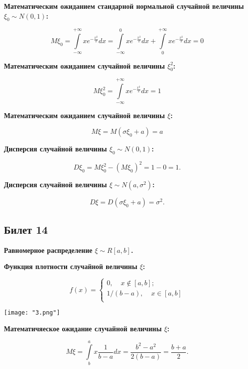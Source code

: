 \textbf{Математическим ожиданием стандарной нормальной
случайной величины $\xi_0 \sim N(0, 1)$:}
\smallskip     

\[
    M\xi_0 = \int\limits^{+\infty}_{-\infty} x e^{-\frac{x^2}{2}} dx =
    \int\limits^0_{-\infty} x e^{-\frac{x^2}{2}} dx +
    \int\limits^{+\infty}_{0} x e^{-\frac{x^2}{2}} dx = 0
\]
\bigskip

\textbf{Математическим ожиданием случайной величины $\xi_0^2$:}
\smallskip     

\[
    M\xi_0^2 = \int\limits^{+\infty}_{-\infty} x e^{-\frac{x^2}{2}} dx = 1
\]
\bigskip

\textbf{Математическим ожиданием случайной величины $\xi$:}
\smallskip     

\[
    M\xi = M(\sigma \xi_0 + a) = a
\]
\bigskip    

\textbf{Дисперсия случайной величины $\xi_0 \sim N(0, 1)$:}  
\smallskip

\[
    D\xi_0 = M\xi^2_0 - (M\xi_0)^2 = 1 - 0 = 1.  
\]

\textbf{Дисперсия случайной величины $\xi \sim N(a,
\sigma^2)$:}  
\smallskip

\[
    D\xi = D(\sigma\xi_0 + a) = \sigma^2.  
\]  
\bigskip

\subsection{Билет 14}

\textbf{Равномерное распределение $\xi \sim R[a, b]$.}
\bigskip

\textbf{Функция плотности случайной величины $\xi$:}
\smallskip

\begin{equation*}
    f(x)=
    \begin{cases}
        0, \;\;\;\; x \notin [a, b];\\
        1/(b - a), \;\;\;\; x \in [a, b]\\
    \end{cases}
\end{equation*}

\begin{center}
    \texttt{[image: "3.png"]}
\end{center}
\bigskip

\textbf{Математичяеское ожидание случайной величины $\xi$:}
\smallskip

\[
    M\xi = \int\limits^a_b x \frac{1}{b - a}dx = \frac{b^2 - a^2}{2(b - a)}=
    \frac{b + a}{2}.  
\]
\bigskip

